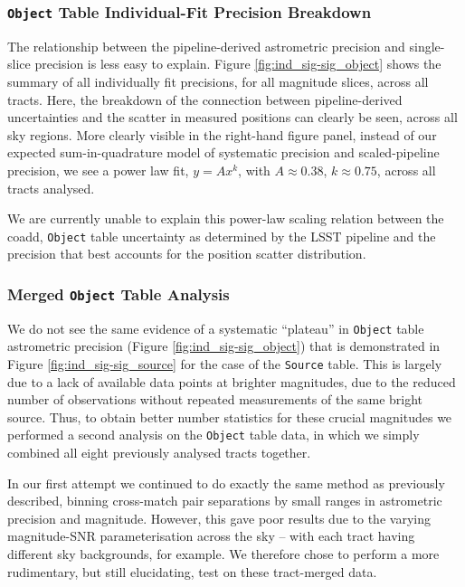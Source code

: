 \documentclass[SE,lsstdraft,authoryear,toc]{lsstdoc}
\begin{document}
\subsubsection{\texttt{Object} Table Individual-Fit Precision Breakdown}
The relationship between the pipeline-derived astrometric precision and single-slice precision is less easy to explain.
Figure \ref{fig:ind_sig-sig_object} shows the summary of all individually fit precisions, for all magnitude slices, across all tracts.
Here, the breakdown of the connection between pipeline-derived uncertainties and the scatter in measured positions can clearly be seen, across all sky regions.
More clearly visible in the right-hand figure panel, instead of our expected sum-in-quadrature model of systematic precision and scaled-pipeline precision, we see a power law fit, $y = A x^k$, with $A \approx 0.38$, $k \approx 0.75$, across all tracts analysed.

We are currently unable to explain this power-law scaling relation between the coadd, \texttt{Object} table uncertainty as determined by the LSST pipeline and the precision that best accounts for the position scatter distribution.

\subsubsection{Merged \texttt{Object} Table Analysis}
We do not see the same evidence of a systematic ``plateau'' in \texttt{Object} table astrometric precision (Figure \ref{fig:ind_sig-sig_object}) that is demonstrated in Figure \ref{fig:ind_sig-sig_source} for the case of the \texttt{Source} table.
This is largely due to a lack of available data points at brighter magnitudes, due to the reduced number of observations without repeated measurements of the same bright source.
Thus, to obtain better number statistics for these crucial magnitudes we performed a second analysis on the \texttt{Object} table data, in which we simply combined all eight previously analysed tracts together.

In our first attempt we continued to do exactly the same method as previously described, binning cross-match pair separations by small ranges in astrometric precision and magnitude.
However, this gave poor results due to the varying magnitude-SNR parameterisation across the sky -- with each tract having different sky backgrounds, for example.
We therefore chose to perform a more rudimentary, but still elucidating, test on these tract-merged data.
\end{document}
